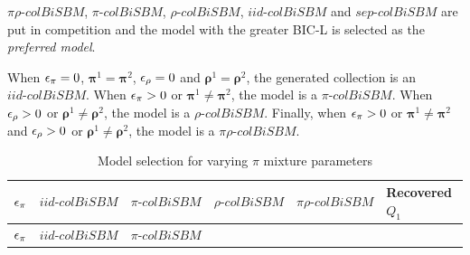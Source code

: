 \(\pi\rho\text{-}colBiSBM\), \(\pi\text{-}colBiSBM\),
\(\rho\text{-}colBiSBM\), \(iid\text{-}colBiSBM\) and
\(sep\text{-}colBiSBM\) are put in competition and the model with the
greater BIC-L is selected as the \emph{preferred model}.

When \(\eps[\pi] = 0\), \(\bm{\pi}^1 = \bm{\pi}^2\), \(\eps[\rho] = 0\)
and \(\bm{\rho}^1 = \bm{\rho}^2\), the generated collection is an
\(iid\text{-}colBiSBM\). When \(\eps[\pi] > 0\) or
\(\bm{\pi}^1 \neq \bm{\pi}^2\), the model is a \(\pi\text{-}colBiSBM\).
When \(\eps[\rho] > 0\) or \(\bm{\rho}^1 \neq \bm{\rho}^2\), the model
is a \(\rho\text{-}colBiSBM\). Finally, when \(\eps[\pi] > 0\) or
\(\bm{\pi}^1 \neq \bm{\pi}^2\) and \(\eps[\rho] > 0\) or
\(\bm{\rho}^1 \neq \bm{\rho}^2\), the model is a
\(\pi\rho\text{-}colBiSBM\).

\begin{longtable}[]{@{}lccccl@{}}
\caption{\label{tab:pi-model-sel}Model selection for varying \(\pi\)
mixture parameters}\tabularnewline
\toprule
\begin{minipage}[b]{0.08\columnwidth}\raggedright
\(\eps[\pi]\)\strut
\end{minipage} & \begin{minipage}[b]{0.15\columnwidth}\centering
\(iid\text{-}colBiSBM\)\strut
\end{minipage} & \begin{minipage}[b]{0.15\columnwidth}\centering
\(\pi\text{-}colBiSBM\)\strut
\end{minipage} & \begin{minipage}[b]{0.16\columnwidth}\centering
\(\rho\text{-}colBiSBM\)\strut
\end{minipage} & \begin{minipage}[b]{0.18\columnwidth}\centering
\(\pi\rho\text{-}colBiSBM\)\strut
\end{minipage} & \begin{minipage}[b]{0.11\columnwidth}\raggedright
Recovered \(Q_1\)\strut
\end{minipage}\tabularnewline
\midrule
\endfirsthead
\toprule
\begin{minipage}[b]{0.08\columnwidth}\raggedright
\(\eps[\pi]\)\strut
\end{minipage} & \begin{minipage}[b]{0.15\columnwidth}\centering
\(iid\text{-}colBiSBM\)\strut
\end{minipage} & \begin{minipage}[b]{0.15\columnwidth}\centering
\(\pi\text{-}colBiSBM\)\strut
\end{minipage} & \begin{minipage}[b]{0.16\columnwidth}\centering

\end{minipage}
\end{longtable}
